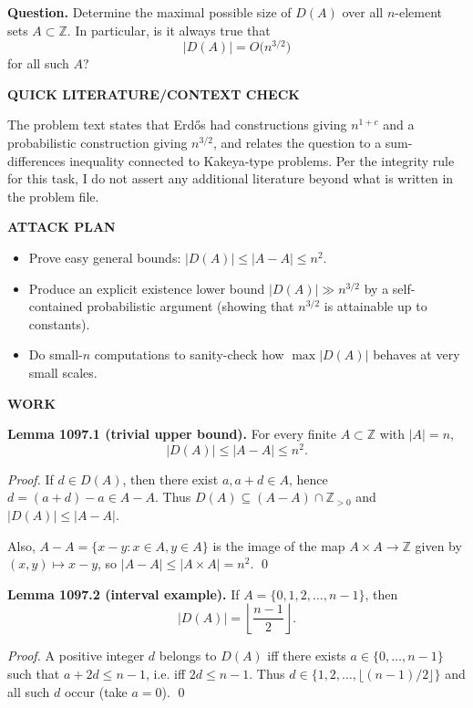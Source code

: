 \smallskip
\noindent
\textbf{Question.}
Determine the maximal possible size of $D(A)$ over all $n$-element sets $A\subset\mathbb{Z}$. In particular, is it always true that
\[
|D(A)|=O\bigl(n^{3/2}\bigr)
\]
for all such $A$?

\medskip
\noindent\textbf{QUICK LITERATURE/CONTEXT CHECK}

\smallskip
\noindent
The problem text states that Erd\H{o}s had constructions giving $n^{1+c}$ and a probabilistic construction giving $n^{3/2}$, and relates the question to a sum-differences inequality connected to Kakeya-type problems. Per the integrity rule for this task, I do not assert any additional literature beyond what is written in the problem file.

\medskip
\noindent\textbf{ATTACK PLAN}

\smallskip
\noindent
\begin{itemize}
\item Prove easy general bounds: $|D(A)|\le |A-A|\le n^2$.
\item Produce an explicit existence lower bound $|D(A)|\gg n^{3/2}$ by a self-contained probabilistic argument (showing that $n^{3/2}$ is attainable up to constants).
\item Do small-$n$ computations to sanity-check how $\max|D(A)|$ behaves at very small scales.
\end{itemize}

\medskip
\noindent\textbf{WORK}

\smallskip
\noindent\textbf{Lemma 1097.1 (trivial upper bound).}
For every finite $A\subset\mathbb{Z}$ with $|A|=n$,
\[
|D(A)|\le |A-A|\le n^2.
\]

\smallskip
\noindent\emph{Proof.}
If $d\in D(A)$, then there exist $a,a+d\in A$, hence $d=(a+d)-a\in A-A$. Thus $D(A)\subseteq (A-A)\cap\mathbb{Z}_{>0}$ and $|D(A)|\le |A-A|$.

Also, $A-A=\{x-y:x\in A,y\in A\}$ is the image of the map $A\times A\to\mathbb{Z}$ given by $(x,y)\mapsto x-y$, so $|A-A|\le |A\times A|=n^2$. \qed

\smallskip
\noindent\textbf{Lemma 1097.2 (interval example).}
If $A=\{0,1,2,\dots,n-1\}$, then
\[
|D(A)|=\left\lfloor\frac{n-1}{2}\right\rfloor.
\]

\smallskip
\noindent\emph{Proof.}
A positive integer $d$ belongs to $D(A)$ iff there exists $a\in\{0,\dots,n-1\}$ such that $a+2d\le n-1$, i.e. iff $2d\le n-1$. Thus $d\in\{1,2,\dots,\lfloor (n-1)/2\rfloor\}$ and all such $d$ occur (take $a=0$). \qed

